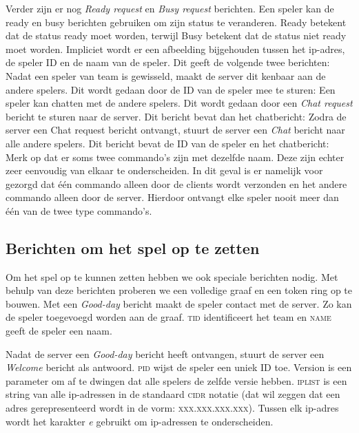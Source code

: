     Verder zijn er nog \emph{Ready request} en \emph{Busy request} berichten. Een speler kan de ready en busy berichten gebruiken om zijn status te veranderen. Ready betekent dat de status ready moet worden, terwijl Busy betekent dat de status niet ready moet worden. Impliciet wordt er een afbeelding bijgehouden tussen het ip-adres, de speler ID en de naam van de speler. Dit geeft de volgende twee berichten:
    Nadat een speler van team is gewisseld, maakt de server dit kenbaar aan de andere spelers. Dit wordt gedaan door de ID van de speler mee te sturen:
    Een speler kan chatten met de andere spelers. Dit wordt gedaan door een \emph{Chat request} bericht te sturen naar de server. Dit bericht bevat dan het chatbericht:
    Zodra de server een Chat request bericht ontvangt, stuurt de server een \emph{Chat} bericht naar alle andere spelers. Dit bericht bevat de ID van de speler en het chatbericht:
    Merk op dat er soms twee commando's zijn met dezelfde naam. Deze zijn echter zeer eenvoudig van elkaar te onderscheiden. In dit geval is er namelijk voor gezorgd dat \'e\'en commando alleen door de clients wordt verzonden en het andere commando alleen door de server. Hierdoor ontvangt elke speler nooit meer dan \'e\'en van de twee type commando's.

\subsection{Berichten om het spel op te zetten}
Om het spel op te kunnen zetten hebben we ook speciale berichten nodig. Met behulp van deze berichten proberen we een volledige graaf en een token ring op te bouwen. Met een \emph{Good-day} bericht maakt de speler contact met de server. Zo kan de speler toegevoegd worden aan de graaf. \textsc{tid} identificeert het team en \textsc{name} geeft de speler een naam.

Nadat de server een \emph{Good-day} bericht heeft ontvangen, stuurt de server een \emph{Welcome} bericht als antwoord. \textsc{pid} wijst de speler een uniek ID toe. Version is een parameter om af te dwingen dat alle spelers de zelfde versie hebben. \textsc{iplist} is een string van alle ip-adressen in de standaard \textsc{cidr} notatie (dat wil zeggen dat een adres gerepresenteerd wordt in de vorm: \textsc{xxx.xxx.xxx.xxx}). Tussen elk ip-adres wordt het karakter \emph{e} gebruikt om ip-adressen te onderscheiden.

